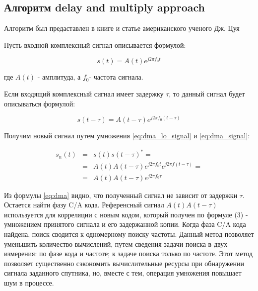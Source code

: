 \subsection{Алгоритм delay and multiply approach}

Алгоритм был предаставлен в книге и статье американского ученого Дж.
Цуя \cite{lin_dma, tsui}

Пусть входной комплексный сигнал описывается формулой:

\begin{center}
\begin{equation}
	s(t)=A(t)e^{j2{\pi}f_{0}t}\label{eq:dma_lo_signal}
\end{equation}
\end{center}

где $A(t)$ - амплитуда, а $f_{0}$- частота сигнала.

Если входящий комплексный сигнал имеет задержку $\tau$, то данный
сигнал будет описываться формулой: 

\begin{center}
\begin{equation}
	\label{eq:dma_signal}
	s(t-\tau)=A(t-\tau)e^{j2{\pi}f_{0}(t-\tau)}
\end{equation}
\end{center}

Получим новый сигнал путем умножения \ref{eq:dma_lo_signal} и \ref{eq:dma_signal}:

\begin{center}
\begin{eqnarray}
s_{n}(t) & = & s(t)s(t-\tau)^{*}=\nonumber \\
 & = & A(t)A(t-\tau)e^{j2\pi f_{0}t}e^{j2\pi f(t-\tau)}=\label{eq:dma}\\
 & = & A(t)A(t-\tau)e^{j2\pi f_{0}\tau}\nonumber 
\end{eqnarray}

\par\end{center}

Из формулы \ref{eq:dma} видно, что полученный сигнал не зависит от
задержки $\tau$. Остается найти фазу C/A кода. Референсный сигнал
$A(t)A(t-\tau)$ используется для корреляции с новым кодом, который
получен по формуле (3) - умножением принятого сигнала и его задержанной
копии. Когда фаза C/A кода найдена, поиск сводится к одномерному поиску
частоты. Данный метод позволяет уменьшить количество вычислений, путем
сведения задачи поиска в двух измерения: по фазе кода и частоте; к
задаче поиска только по частоте. Этот метод позволяет существенно
сэкономить вычислительные ресурсы при обнаружении сигнала заданного
спутника, но, вместе с тем, операция умножения повышает шум в процессе.

